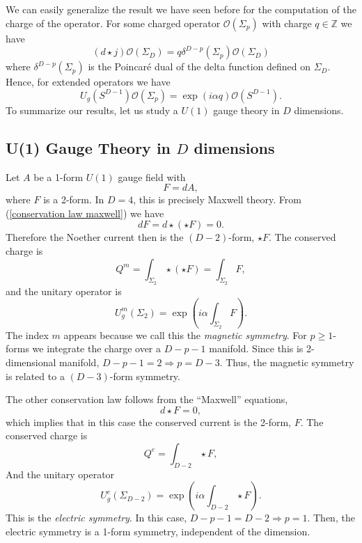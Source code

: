 \documentclass{article}
\begin{document}
We can easily generalize the result we have seen before for the computation of the charge of the operator. For some  charged operator $\mathcal{O}(\Sigma_p)$ with charge $q\in\mathbb{Z}$ we have
\begin{equation}\label{action of hf symmetry}
	(d\star j)\mathcal{O}(\Sigma_D)=q\delta^{D-p}(\Sigma_p)\mathcal{O}(\Sigma_D)
\end{equation}
where $\delta^{D-p}(\Sigma_p)$  is the Poincaré dual of the delta function defined on $\Sigma_D$. Hence, for extended operators we have 
\begin{equation}
	U_g(S^{D-1})\mathcal{O}(\Sigma_p)=\exp(i\alpha q)\mathcal{O}(S^{D-1}).
\end{equation}
To summarize our results, let us study a $U(1)$ gauge theory in $D$ dimensions. 
\subsection{U(1) Gauge Theory in $D$ dimensions}
Let $A$ be a 1-form $U(1)$ gauge field with 
\begin{equation}\label{conservation law maxwell}
	F=dA,
\end{equation}
where $F$ is a 2-form. In $D=4$, this is precisely Maxwell theory. From (\ref{conservation law maxwell}) we have
\begin{equation}
	dF=d\star(\star F)=0. 
\end{equation}
Therefore the Noether current then is the $(D-2)$-form, $\star F$.  The conserved charge is 
\begin{equation}
	Q^m=\int_{\Sigma_2}\star (\star F)=\int_{\Sigma_2}F,
\end{equation}
and the unitary operator is 
\begin{equation}
	U_g^m(\Sigma_2)=\exp\left(i\alpha\int_{\Sigma_2}F\right).
\end{equation}
The index $m$ appears because we call this the \textit{magnetic symmetry}. For $p\geq 1$-forms we integrate the charge over a $D-p-1$ manifold. Since this is 2-dimensional manifold, $D-p-1=2\Rightarrow p=D-3$. Thus, the magnetic symmetry is related to a $(D-3)$-form symmetry. 

The other conservation law follows from the ``Maxwell'' equations,
\begin{equation}
	d\star F=0,
\end{equation} 
which implies that in this case the conserved current is the 2-form, $F$. The conserved charge is 
\begin{equation}
	Q^e=\int_{D-2}\star F, 
\end{equation}
And the unitary operator
\begin{equation}
	U^e_g(\Sigma_{D-2})=\exp\left(i\alpha\int_{D-2}\star F\right).
\end{equation}
This is the \textit{electric symmetry}. In this case, $D-p-1=D-2\Rightarrow p=1$. Then, the electric symmetry is a 1-form symmetry, independent of the dimension. 
\end{document}
